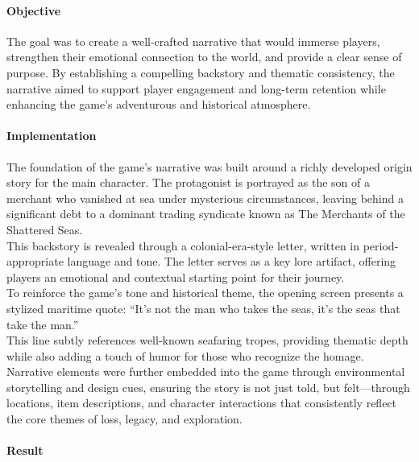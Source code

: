 \documentclass{article}
\begin{document}
\paragraph{Objective}\hfill

The goal was to create a well-crafted narrative that would immerse players, strengthen their emotional connection to the world, and provide a clear sense of purpose. By establishing a compelling backstory and thematic consistency, the narrative aimed to support player engagement and long-term retention while enhancing the game's adventurous and historical atmosphere.

\paragraph{Implementation}\hfill

The foundation of the game's narrative was built around a richly developed origin story for the main character. The protagonist is portrayed as the son of a merchant who vanished at sea under mysterious circumstances, leaving behind a significant debt to a dominant trading syndicate known as The Merchants of the Shattered Seas.\\

This backstory is revealed through a colonial-era-style letter, written in period-appropriate language and tone. The letter serves as a key lore artifact, offering players an emotional and contextual starting point for their journey.\\

To reinforce the game's tone and historical theme, the opening screen presents a stylized maritime quote: “It's not the man who takes the seas, it's the seas that take the man.”\\

This line subtly references well-known seafaring tropes, providing thematic depth while also adding a touch of humor for those who recognize the homage.\\

Narrative elements were further embedded into the game through environmental storytelling and design cues, ensuring the story is not just told, but felt—through locations, item descriptions, and character interactions that consistently reflect the core themes of loss, legacy, and exploration.

\paragraph{Result}\hfill
\end{document}
